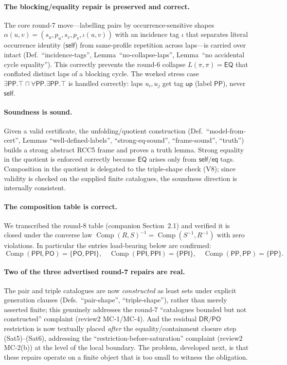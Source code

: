 \documentclass[11pt]{article}
\newcommand{\EQ}{\mathsf{EQ}}
\newcommand{\DR}{\mathsf{DR}}
\newcommand{\PO}{\mathsf{PO}}
\newcommand{\PP}{\mathsf{PP}}
\newcommand{\PPI}{\mathsf{PPI}}
\newcommand{\comp}{\operatorname{Comp}}
\newcommand{\self}{\mathsf{self}}
\newcommand{\eqtag}{\mathsf{eq}}
\newcommand{\up}{\mathsf{up}}
\begin{document}
\paragraph{The blocking/equality repair is preserved and correct.}
The core round-7 move---labelling pairs by occurrence-sensitive shapes
$\alpha(u,v)=(s_u,p_u,s_v,p_v,\iota(u,v))$ with an incidence tag $\iota$ that
separates literal occurrence identity ($\self$) from same-profile repetition
across laps---is carried over intact (Def.~``incidence-tags'',
Lemma~``no-collapse-laps'', Lemma~``no accidental cycle equality'').  This
correctly prevents the round-6 collapse $L(\pi,\pi)=\EQ$ that conflated distinct
laps of a blocking cycle.  The worked stress case
$\exists\PP.\top\sqcap\forall\PP.\exists\PP.\top$ is handled correctly: laps
$u_i,u_j$ get tag $\up$ (label $\PP$), never $\self$.

\paragraph{Soundness is sound.}
Given a valid certificate, the unfolding/quotient construction
(Def.~``model-from-cert'', Lemmas ``well-defined-labels'',
``strong-eq-sound'', ``frame-sound'', ``truth'') builds a strong abstract RCC5
frame and proves a truth lemma.  Strong equality in the quotient is enforced
correctly because $\EQ$ arises only from $\self/\eqtag$ tags.  Composition in the
quotient is delegated to the triple-shape check (V8); since validity is checked
on the supplied finite catalogues, the soundness direction is internally
consistent.

\paragraph{The composition table is correct.}
We transcribed the round-8 table (companion Section~2.1) and verified it is
closed under the converse law $\comp(R,S)^{-1}=\comp(S^{-1},R^{-1})$ with zero
violations.  In particular the entries load-bearing below are confirmed:
\[
  \comp(\PPI,\PO)=\{\PO,\PPI\},\quad
  \comp(\PPI,\PPI)=\{\PPI\},\quad
  \comp(\PP,\PP)=\{\PP\}.
\]

\paragraph{Two of the three advertised round-7 repairs are real.}
The pair and triple catalogues are now \emph{constructed} as least sets under
explicit generation clauses (Defs.~``pair-shape'', ``triple-shape''), rather
than merely asserted finite; this genuinely addresses the round-7
``catalogues bounded but not constructed'' complaint (review2 MC-1/MC-4).  And
the residual $\DR/\PO$ restriction is now textually placed \emph{after} the
equality/containment closure step (Sat5)--(Sat6), addressing the
``restriction-before-saturation'' complaint (review2 MC-2(b)) at the level of
the local boundary.  The problem, developed next, is that these repairs operate
on a finite object that is too small to witness the obligation.
\end{document}
